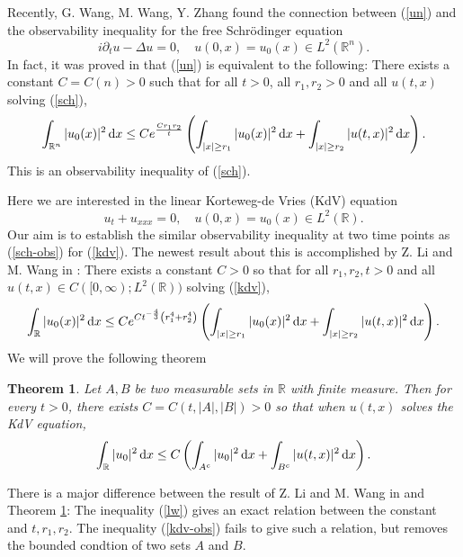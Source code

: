 \documentclass[12pt]{amsart}
\def\R {\mathbb{R}}
\def\d{{\,\rm d}}
\newtheorem{theorem}[proposition]{Theorem}
\theoremstyle{definition}
\numberwithin{equation}{section}
\begin{document}
Recently, G. Wang, M. Wang, Y. Zhang \cite{WWZ} found the connection between (\ref{un}) and the observability inequality for the free Schr\"{o}dinger equation
\begin{equation}
    i\partial_t u-\Delta u=0,\quad u(0,x)=u_0(x)\in L^2(\R^n).\label{sch}
\end{equation}
In fact, it was proved in \cite{WWZ} that (\ref{un}) is equivalent to the following: There exists a constant $C=C(n)>0$ such that for all $t>0$, all $r_1,r_2>0$ and all $u(t,x)$ solving   (\ref{sch}), 
\begin{equation}
    \int_{\R^n}|u_0(x)|^2\d x \le C e^{\frac{Cr_1r_2}{t}}\left(\int_{|x|\ge r_1} |u_0(x)|^2\d x+\int _{|x|\ge r_2}|u(t,x)|^2\d x\right).\label{sch-obs}
\end{equation}
This is an observability inequality of (\ref{sch}).

Here we are interested in the linear Korteweg-de Vries (KdV) equation
\begin{equation}
u_t+u_{xxx}=0, \quad u(0,x)=u_0(x)\in L^2(\R).\label{kdv}
\end{equation}
Our aim is to establish the similar observability inequality at two time points as (\ref{sch-obs}) for (\ref{kdv}). The newest result about this is accomplished by Z. Li and M. Wang in \cite{LW}: There exists a constant $C>0$ so that for all $r_1,r_2,t>0$ and all $u(t,x)\in C([0,\infty);L^2(\R))$ solving (\ref{kdv}),
\begin{equation}
    \int_{\R}|u_0(x)|^2\d x\le Ce^{Ct^{-\frac{4}{3}}\left(r_1^4+r_2^4\right)}\left(\int_{|x|\ge r_1}|u_0(x)|^2\d x+\int _{|x|\ge r_2}|u(t,x)|^2\d x\right).\label{lw}
\end{equation}
We will prove the following theorem 
\begin{theorem}\label{thm-1}
    Let $A,B$ be two  measurable sets in $\R$ with finite measure. Then for every $t>0$, there exists $C=C(t,|A|,|B|)>0$ so that when $u(t,x)$ solves the KdV equation,
    \begin{equation}
    \int_\R |u_0|^2\d x \leq C\left( \int_{A^c}|u_0|^2\d x + \int_{B^c}|u(t,x)|^2\d x \right).\label{kdv-obs}
    \end{equation}
    \end{theorem}
There is a major difference between  the result of Z. Li and M. Wang in \cite{LW} and Theorem \ref{thm-1}:
The inequality (\ref{lw}) gives an exact relation between the constant and $t,r_1,r_2$. The inequality (\ref{kdv-obs}) fails to give such a relation, but removes the bounded condtion of two sets $A$ and $B$.
\end{document}
